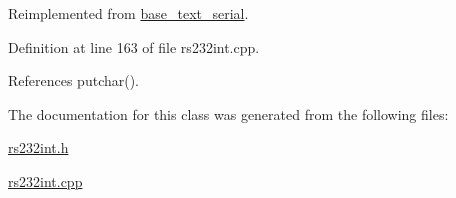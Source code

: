 Reimplemented from \hyperlink{classbase__text__serial_a1699dd6cb65575604f66abbf762a2131}{base\-\_\-text\-\_\-serial}.



Definition at line 163 of file rs232int.\-cpp.



References putchar().



The documentation for this class was generated from the following files\-:\begin{DoxyCompactItemize}
\item 
\hyperlink{rs232int_8h}{rs232int.\-h}\item 
\hyperlink{rs232int_8cpp}{rs232int.\-cpp}\end{DoxyCompactItemize}
